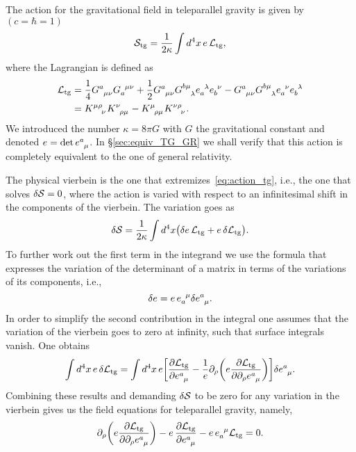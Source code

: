 \documentclass[
final,
11pt,
a4paper,
DIV=11,
headinclude=true,
footinclude=false,
bibliography=totoc,
twoside=true,  %
BCOR=5mm
]{scrbook}
\begin{document}
The action for the gravitational field in teleparallel gravity is 
given by $(c = \hbar = 1)$
\begin{equation}
\label{eq:action_tg}
  \mathcal{S}_\mathrm{tg} = \frac{1}{2 \kappa} \int d^4 x \, e \, 
  \mathcal{L}_\mathrm{tg},
\end{equation}
where the Lagrangian is defined as
\begin{align}
\label{eq:lagrangian_tg}
  \mc{L}_\mrm{tg} &= \frac{1}{4} G \ind{^a_{\mu\nu}} 
  G\ind{_a^{\mu\nu}} + \frac{1}{2} G\ind{^a_{\mu\nu}} 
  G\ind{^{b\mu}_\lambda} e\ind{_a^\lambda} e\ind{_b^\nu} 
  - G\ind{^a_{\mu\nu}} G\ind{^{b\mu}_\lambda} e\ind{_a^\nu} 
  e\ind{_b^\lambda}
  \\
\notag
  &= K\ind{^{\mu\rho}_\nu} K\ind{^\nu_{\rho\mu}} 
  - K\ind{^\mu_{\rho\mu}} K\ind{^{\nu\rho}_\nu}.
\end{align}
We introduced the number $\kappa = 8 \pi G$ with $G$ the 
gravitational constant and denoted $e = \det e\ind{^a_\mu}$.
In \S\ref{sec:equiv_TG_GR} we shall verify that this action is 
completely equivalent to the one of general relativity.

The physical vierbein is the one that 
extremizes~\eqref{eq:action_tg}, i.e., the one that solves 
$\delta \mathcal{S} = 0$, where the action is varied with respect to 
an infinitesimal shift in the components of the vierbein. The 
variation goes as
\begin{equation*}
  \delta \mathcal{S} = \frac{1}{2\kappa} \int d^4 x \big( \delta e \, 
  \mathcal{L}_\mathrm{tg} + e \, \delta \mathcal{L}_\mathrm{tg} \big).
\end{equation*}
To further work out the first term in the integrand we use the 
formula that expresses the variation of the determinant of 
a matrix in terms of the variations of its components, i.e.,
\begin{equation*}
  \delta e = e \, e\ind{_a^\mu} \delta e\ind{^a_\mu}.
\end{equation*}
In order to simplify the second contribution in the integral one 
assumes that the variation of the vierbein goes to zero at 
infinity, such that surface integrals vanish. One obtains
\begin{equation*}
  \int d^4 x \, e \, \delta \mc{L}_\mrm{tg} =
  \int d^4 x \, e \bigg[ \frac{\pd \mc{L}_\mrm{tg}}{\pd 
    e\ind{^a_\mu}} - \frac{1}{e} \pd_\rho \bigg(e \frac{\pd 
    \mc{L}_\mrm{tg}}{\pd \pd_\rho e\ind{^a_\mu}} \bigg) \bigg] 
  \delta e\ind{^a_\mu}.
\end{equation*}
Combining these results and demanding $\delta \mathcal{S}$ to be zero 
for any variation in the vierbein gives us the field equations 
for teleparallel gravity, namely,
\begin{equation}
\label{eq:fieldEqsTG}
  \pd_\rho \bigg(e \frac{\pd \mc{L}_\mrm{tg}}{\pd \pd_\rho 
    e\ind{^a_\mu}} \bigg) - e\, \frac{\pd \mc{L}_\mrm{tg}}{\pd 
    e\ind{^a_\mu}} - e\, e\ind{_a^\mu} \mc{L}_\mrm{tg} = 0.
\end{equation}
\end{document}

